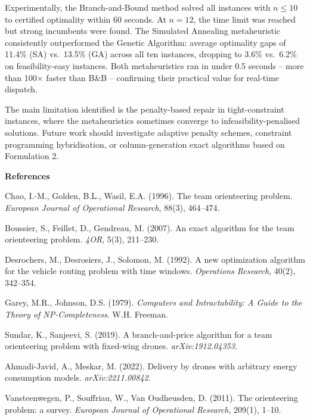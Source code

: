 \documentclass[12pt,a4paper]{article}
\begin{document}
Experimentally, the Branch-and-Bound method solved all instances with $n \leq 10$ to
certified optimality within 60 seconds. At $n=12$, the time limit was reached but
strong incumbents were found. The Simulated Annealing metaheuristic consistently
outperformed the Genetic Algorithm: average optimality gaps of 11.4\% (SA) vs.\ 13.5\%
(GA) across all ten instances, dropping to 3.6\% vs.\ 6.2\% on feasibility-easy
instances. Both metaheuristics ran in under 0.5 seconds -- more than 100$\times$ faster
than B\&B -- confirming their practical value for real-time dispatch.

The main limitation identified is the penalty-based repair in tight-constraint instances,
where the metaheuristics sometimes converge to infeasibility-penalised solutions. Future
work should investigate adaptive penalty schemes, constraint programming hybridisation,
or column-generation exact algorithms based on Formulation 2.

\bigskip
\noindent\textbf{References}

\begin{enumerate}[label={[\arabic*]}]
  \item Chao, I.-M., Golden, B.L., Wasil, E.A. (1996). The team orienteering problem.
  \emph{European Journal of Operational Research}, 88(3), 464--474.
  \item Boussier, S., Feillet, D., Gendreau, M. (2007). An exact algorithm for the team
  orienteering problem. \emph{4OR}, 5(3), 211--230.
  \item Desrochers, M., Desrosiers, J., Solomon, M. (1992). A new optimization algorithm
  for the vehicle routing problem with time windows. \emph{Operations Research}, 40(2),
  342--354.
  \item Garey, M.R., Johnson, D.S. (1979). \emph{Computers and Intractability: A Guide
  to the Theory of NP-Completeness}. W.H. Freeman.
  \item Sundar, K., Sanjeevi, S. (2019). A branch-and-price algorithm for a team
  orienteering problem with fixed-wing drones. \emph{arXiv:1912.04353}.
  \item Ahmadi-Javid, A., Meskar, M. (2022). Delivery by drones with arbitrary energy
  consumption models. \emph{arXiv:2211.00842}.
  \item Vansteenwegen, P., Souffriau, W., Van Oudheusden, D. (2011). The orienteering
  problem: a survey. \emph{European Journal of Operational Research}, 209(1), 1--10.
\end{enumerate}
\end{document}
